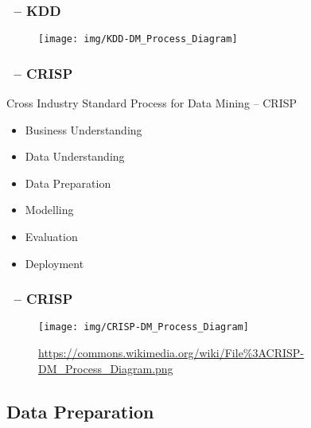 \begin{frame}
    \frametitle{\insertsubsection \ -- KDD}
    \begin{figure}[H]
        \centering
        \texttt{[image: img/KDD-DM\_Process\_Diagram]}
        \caption{\cite{kdd96}}\label{fig:kdd}
    \end{figure}
\end{frame}

\begin{frame}
    \frametitle{\insertsubsection \ -- CRISP}
    \begin{block}{Cross Industry Standard Process for Data Mining -- CRISP \cite{crisp2000}}
        \vspace{0.5em}
        \begin{itemize}
            \setlength\itemsep{1em}
            \item Business Understanding
            \item Data Understanding
            \item Data Preparation
            \item Modelling
            \item Evaluation
            \item Deployment
        \end{itemize}
    \end{block}
\end{frame}

\begin{frame}
    \frametitle{\insertsubsection \ -- CRISP}
    \begin{figure}[H]
        \centering
        \texttt{[image: img/CRISP-DM\_Process\_Diagram]}
        \caption{\url{https://commons.wikimedia.org/wiki/File\%3ACRISP-DM\_Process\_Diagram.png}\label{fig:crisp}}
    \end{figure}
\end{frame}

\subsection{Data Preparation}

